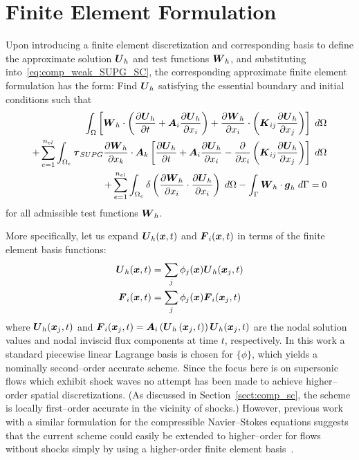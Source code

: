 \section{Finite Element Formulation\label{sect:comp_fe_formulation}}
Upon introducing a finite element discretization and corresponding basis to define the approximate solution ${\boldsymbol{U}}_h$ and test functions ${\boldsymbol{W}}_h$, and substituting into~\eqref{eq:comp_weak_SUPG_SC}, the corresponding approximate finite element formulation has the form:  Find ${\boldsymbol{U}}_h$ satisfying the essential boundary and initial conditions such that
\begin{eqnarray}
  \label{eq:comp_fe_SUPG_SC}
  \int_\Omega  \left[ {\boldsymbol{W}}_h\cdot\left({\frac{\partial{{\boldsymbol{U}}_h}}{\partial{t}}} + {\boldsymbol{A}}_i {\frac{\partial{{\boldsymbol{U}}_h}}{\partial{x_i}}} \right) + {\frac{\partial{{\boldsymbol{W}}_h}}{\partial{x_i}}} \cdot \left( {\boldsymbol{K}}_{ij} {\frac{\partial{{\boldsymbol{U}}_h}}{\partial{x_j}}} \right) \right] \; d\Omega \nonumber \\
  + \sum_{e=1}^{n_{el}} \int_{\Omega_e} {\boldsymbol{\tau}}_{SUPG} {\frac{\partial{{\boldsymbol{W}}_h}}{\partial{x_k}}}\cdot{\boldsymbol{A}}_k
  \left[ {\frac{\partial{{\boldsymbol{U}}_h}}{\partial{t}}} + {\boldsymbol{A}}_i {\frac{\partial{{\boldsymbol{U}}_h}}{\partial{x_i}}} - {\frac{\partial{}}{\partial{x_i}}} \left( {\boldsymbol{K}}_{ij} {\frac{\partial{{\boldsymbol{U}}_h}}{\partial{x_j}}} \right) \right] \; d\Omega  \nonumber \\
  + \sum_{e=1}^{n_{el}} \int_{\Omega_e} \delta \left({\frac{\partial{{\boldsymbol{W}}_h}}{\partial{x_i}}}\cdot{\frac{\partial{{\boldsymbol{U}}_h}}{\partial{x_i}}}\right)\; d\Omega
   -\int_\Gamma {\boldsymbol{W}}_h\cdot{\boldsymbol{g}}_h \; d\Gamma = 0
\end{eqnarray}
for all admissible test functions ${\boldsymbol{W}}_h$.

More specifically, let us expand ${\boldsymbol{U}}_h({\boldsymbol{x}},t)$ and ${\boldsymbol{F}}_i({\boldsymbol{x}},t)$ in terms of the finite element basis functions:
\begin{align}
  {\boldsymbol{U}}_h  ({\boldsymbol{x}},t) &= \sum_j \phi_j({\boldsymbol{x}}) {\boldsymbol{U}}_h({\boldsymbol{x}}_j,t)   \label{eq:disc_U_expanded} \\
  {\boldsymbol{F}}_i({\boldsymbol{x}},t) &= \sum_j \phi_j({\boldsymbol{x}}) {\boldsymbol{F}}_i({\boldsymbol{x}}_j,t) \label{eq:disc_F_expanded}
\end{align}
where ${\boldsymbol{U}}_h({\boldsymbol{x}}_j,t)$ and ${\boldsymbol{F}}_i({\boldsymbol{x}}_j,t)={\boldsymbol{A}}_i\left({\boldsymbol{U}}_h\left({\boldsymbol{x}}_j,t\right)\right){\boldsymbol{U}}_h({\boldsymbol{x}}_j,t)$ are the nodal solution values and nodal inviscid flux components at time $t$, respectively. In this work a standard piecewise linear Lagrange basis is chosen for $\{\phi\}$, which yields a nominally second--order accurate scheme.  Since the focus here is on supersonic flows which exhibit shock waves no attempt has been made to achieve higher--order spatial discretizations. (As discussed in Section~\ref{sect:comp_sc}, the scheme is locally first--order accurate in the vicinity of shocks.)  However, previous work with a similar formulation for the compressible Navier--Stokes equations suggests that the current scheme could easily be extended to higher--order for flows without shocks simply by using a higher-order finite element basis~\cite{bonhaus_dissertation}.



